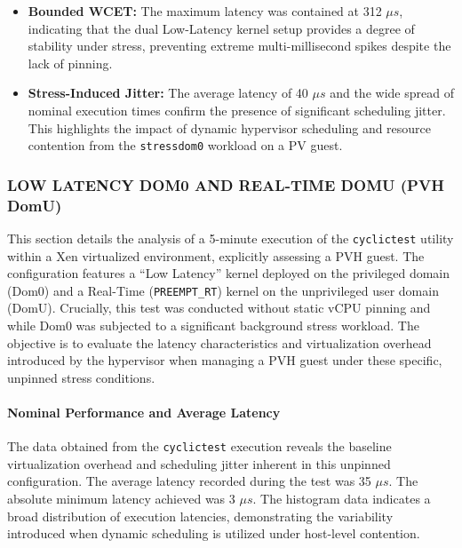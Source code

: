 \begin{itemize}
\item
  \textbf{Bounded WCET:} The maximum latency was contained at 312 $\mu s$,
  indicating that the dual Low-Latency kernel setup provides a degree of
  stability under stress, preventing extreme multi-millisecond spikes
  despite the lack of pinning.
\item
  \textbf{Stress-Induced Jitter:} The average latency of 40 $\mu s$ and the
  wide spread of nominal execution times confirm the presence of
  significant scheduling jitter. This highlights the impact of dynamic
  hypervisor scheduling and resource contention from the
  \texttt{stressdom0} workload on a PV guest.
\end{itemize}

\subsubsection{LOW LATENCY DOM0 AND REAL-TIME DOMU (PVH
DomU)}\label{low-latency-dom0-and-real-time-domu-pvh-domu-1}

This section details the analysis of a 5-minute execution of the
\texttt{cyclictest} utility within a Xen virtualized environment,
explicitly assessing a PVH guest. The configuration features a ``Low
Latency'' kernel deployed on the privileged domain (Dom0) and a
Real-Time (\texttt{PREEMPT\_RT}) kernel on the unprivileged user domain
(DomU). Crucially, this test was conducted without static vCPU pinning
and while Dom0 was subjected to a significant background stress
workload. The objective is to evaluate the latency characteristics and
virtualization overhead introduced by the hypervisor when managing a PVH
guest under these specific, unpinned stress conditions.

\paragraph{Nominal Performance and Average
Latency}\label{nominal-performance-and-average-latency-26}

The data obtained from the \texttt{cyclictest} execution reveals the
baseline virtualization overhead and scheduling jitter inherent in this
unpinned configuration. The average latency recorded during the test was
35 $\mu s$. The absolute minimum latency achieved was 3 $\mu s$. The histogram
data indicates a broad distribution of execution latencies,
demonstrating the variability introduced when dynamic scheduling is
utilized under host-level contention.

